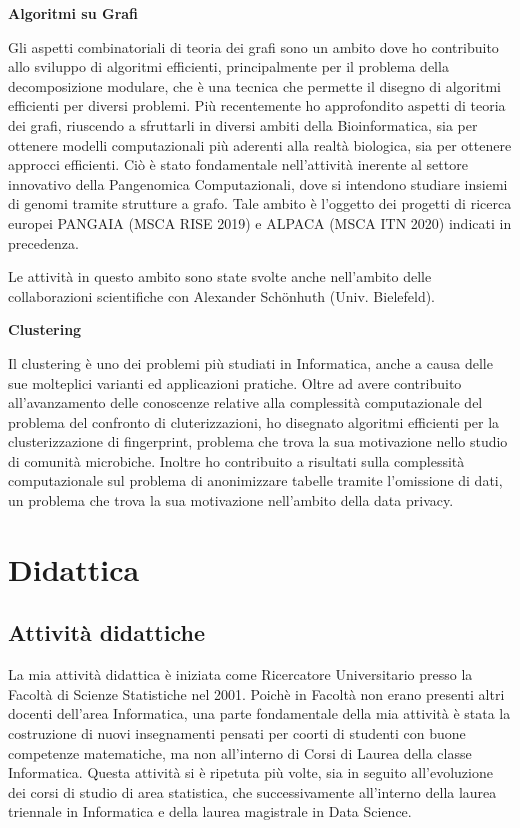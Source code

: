 \documentclass[11pt,a4paper,roman]{moderncv}        %
\begin{document}
  \textbf{Algoritmi su Grafi}

  Gli aspetti combinatoriali di teoria dei grafi sono un ambito dove ho
  contribuito allo sviluppo di algoritmi efficienti, principalmente per il
  problema della decomposizione modulare, che è una tecnica che permette
  il disegno di algoritmi efficienti per diversi problemi. Più
  recentemente ho approfondito aspetti di teoria dei grafi, riuscendo a
  sfruttarli in diversi ambiti della Bioinformatica, sia per ottenere
  modelli computazionali più aderenti alla realtà biologica, sia per
  ottenere approcci efficienti. Ciò è stato fondamentale nell'attività
  inerente al settore innovativo della Pangenomica Computazionali, dove si
  intendono studiare insiemi di genomi tramite strutture a grafo. Tale
  ambito è l'oggetto dei progetti di ricerca europei PANGAIA (MSCA RISE
  2019) e ALPACA (MSCA ITN 2020) indicati in precedenza.

  Le attività in questo ambito sono state svolte anche nell'ambito delle
  collaborazioni scientifiche con Alexander Schönhuth (Univ. Bielefeld).

  \textbf{Clustering}

  Il clustering è uno dei problemi più studiati in Informatica, anche a
  causa delle sue molteplici varianti ed applicazioni pratiche. Oltre ad
  avere contribuito all'avanzamento delle conoscenze relative alla
  complessità computazionale del problema del confronto di
  cluterizzazioni, ho disegnato algoritmi efficienti per la
  clusterizzazione di fingerprint, problema che trova la sua motivazione
  nello studio di comunità microbiche. Inoltre ho contribuito a risultati
  sulla complessità computazionale sul problema di anonimizzare tabelle
  tramite l'omissione di dati, un problema che trova la sua motivazione
  nell'ambito della data privacy.


  \section{Didattica}


  \subsection{Attività didattiche}

  La mia attività didattica è iniziata come Ricercatore Universitario
  presso la Facoltà di Scienze Statistiche nel 2001. Poichè in Facoltà non
  erano presenti altri docenti dell'area Informatica, una parte
  fondamentale della mia attività è stata la costruzione di nuovi
  insegnamenti pensati per coorti di studenti con buone competenze
  matematiche, ma non all'interno di Corsi di Laurea della classe
  Informatica. Questa attività si è ripetuta più volte, sia in seguito
  all'evoluzione dei corsi di studio di area statistica, che
  successivamente all'interno della laurea triennale in Informatica e
  della laurea magistrale in Data Science.
\end{document}
